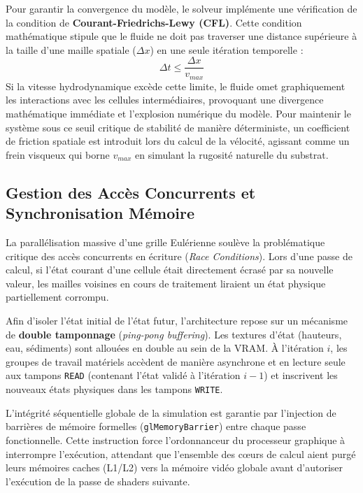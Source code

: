 \documentclass[10pt,twocolumn,a4paper]{article}
\begin{document}
Pour garantir la convergence du modèle, le solveur implémente une vérification de la condition de \textbf{Courant-Friedrichs-Lewy (CFL)}. Cette condition mathématique stipule que le fluide ne doit pas traverser une distance supérieure à la taille d'une maille spatiale ($\Delta x$) en une seule itération temporelle :
\begin{equation}\label{eq:cfl}
    \Delta t \le \frac{\Delta x}{v_{max}}
\end{equation}
Si la vitesse hydrodynamique excède cette limite, le fluide omet graphiquement les interactions avec les cellules intermédiaires, provoquant une divergence mathématique immédiate et l'explosion numérique du modèle. Pour maintenir le système sous ce seuil critique de stabilité de manière déterministe, un coefficient de friction spatiale est introduit lors du calcul de la vélocité, agissant comme un frein visqueux qui borne $v_{max}$ en simulant la rugosité naturelle du substrat.

\subsection{Gestion des Accès Concurrents et Synchronisation Mémoire}\label{subsec:ping_pong}
La parallélisation massive d'une grille Eulérienne soulève la problématique critique des accès concurrents en écriture (\textit{Race Conditions}). Lors d'une passe de calcul, si l'état courant d'une cellule était directement écrasé par sa nouvelle valeur, les mailles voisines en cours de traitement liraient un état physique partiellement corrompu.

Afin d'isoler l'état initial de l'état futur, l'architecture repose sur un mécanisme de \textbf{double tamponnage} (\textit{ping-pong buffering}). Les textures d'état (hauteurs, eau, sédiments) sont allouées en double au sein de la VRAM. À l'itération $i$, les groupes de travail matériels accèdent de manière asynchrone et en lecture seule aux tampons \texttt{READ} (contenant l'état validé à l'itération $i-1$) et inscrivent les nouveaux états physiques dans les tampons \texttt{WRITE}.

L'intégrité séquentielle globale de la simulation est garantie par l'injection de barrières de mémoire formelles (\texttt{glMemoryBarrier}) entre chaque passe fonctionnelle. Cette instruction force l'ordonnanceur du processeur graphique à interrompre l'exécution, attendant que l'ensemble des cœurs de calcul aient purgé leurs mémoires caches (L1/L2) vers la mémoire vidéo globale avant d'autoriser l'exécution de la passe de shaders suivante.
\end{document}
